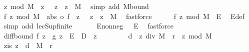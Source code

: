 \begin{isabellebody}
\ {\isachardoublequoteopen}{\isacharparenleft}{\kern0pt}z\ mod\ M{\isacharparenright}{\kern0pt}\ {\isasymin}\ {\isacharbraceleft}{\kern0pt}z{\isachardot}{\kern0pt}\ {}\ {\isasymle}\ z\ {\isasymand}\ z\ {\isacharless}{\kern0pt}\ M{\isacharbraceright}{\kern0pt}{\isachardoublequoteclose}\ \isamarkupfalse%
\ {\isacharparenleft}{\kern0pt}simp\ add{\isacharcolon}{\kern0pt}\ M{\isacharunderscore}{\kern0pt}bound{\isacharparenleft}{\kern0pt}{}{\isacharparenright}{\kern0pt}{\isacharparenright}{\kern0pt}\isanewline
\ \ \ \ \isamarkupfalse%
\ {\isachardoublequoteopen}{\isasymbar}f\ {\isacharparenleft}{\kern0pt}z\ mod\ M{\isacharparenright}{\kern0pt}{\isasymbar}\ {\isasymin}\ {\isacharparenleft}{\kern0pt}abs\ o\ f{\isacharparenright}{\kern0pt}\ {\isacharbackquote}{\kern0pt}\ {\isacharbraceleft}{\kern0pt}z{\isachardot}{\kern0pt}\ {}\ {\isasymle}\ z\ {\isasymand}\ z\ {\isacharless}{\kern0pt}\ M{\isacharbraceright}{\kern0pt}{\isachardoublequoteclose}\ \isamarkupfalse%
\ fastforce\isanewline
\ \ \ \ \isamarkupfalse%
\ {\isachardoublequoteopen}{\isasymbar}f\ {\isacharparenleft}{\kern0pt}z\ mod\ M{\isacharparenright}{\kern0pt}{\isasymbar}\ {\isasymle}\ E{\isachardoublequoteclose}\ \isamarkupfalse%
\ E{\isacharunderscore}{\kern0pt}def\ \isamarkupfalse%
\ {\isacharparenleft}{\kern0pt}simp\ add{\isacharcolon}{\kern0pt}\ le{\isacharunderscore}{\kern0pt}cSup{\isacharunderscore}{\kern0pt}finite{\isacharparenright}{\kern0pt}\isanewline
\ \ \isamarkupfalse%
\isanewline
\ \ \isamarkupfalse%
\ E{\isacharunderscore}{\kern0pt}nonneg{\isacharcolon}{\kern0pt}\ {\isachardoublequoteopen}{}\ {\isasymle}\ E{\isachardoublequoteclose}\ \isamarkupfalse%
\ fastforce\isanewline
\isanewline
\ \ \isamarkupfalse%
\ diff{\isacharunderscore}{\kern0pt}bound{\isacharcolon}{\kern0pt}\ {\isachardoublequoteopen}{\isasymbar}f\ z\ {\isacharminus}{\kern0pt}\ g\ z{\isasymbar}\ {\isasymle}\ E\ {\isacharplus}{\kern0pt}\ D{\isachardoublequoteclose}\ \ z\isanewline
\ \ \isamarkupfalse%
{\isacharminus}{\kern0pt}\isanewline
\ \ \ \ \isamarkupfalse%
\ {\isacharquery}{\kern0pt}d\ {\isacharequal}{\kern0pt}\ {\isachardoublequoteopen}z\ div\ M{\isachardoublequoteclose}\ \ {\isacharquery}{\kern0pt}r\ {\isacharequal}{\kern0pt}\ {\isachardoublequoteopen}z\ mod\ M{\isachardoublequoteclose}\isanewline
\ \ \ \ \isamarkupfalse%
\ z{\isacharunderscore}{\kern0pt}is{\isacharcolon}{\kern0pt}\ {\isachardoublequoteopen}z\ {\isacharequal}{\kern0pt}\ {\isacharquery}{\kern0pt}d\ {\isacharasterisk}{\kern0pt}\ M\ {\isacharplus}{\kern0pt}\ {\isacharquery}{\kern0pt}r{\isachardoublequoteclose}\ \isamarkupfalse%

\end{isabellebody}
